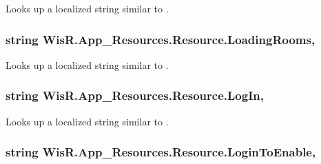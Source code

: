 Looks up a localized string similar to . 

\hypertarget{class_wis_r_1_1_app___resources_1_1_resource_a27c802797504c788ba97124cbaf281ef}{}
\subsubsection[{Loading\+Rooms}]{\setlength{\rightskip}{0pt plus 5cm}string Wis\+R.\+App\+\_\+\+Resources.\+Resource.\+Loading\+Rooms\hspace{0.3cm}{\ttfamily [static]}, {\ttfamily [get]}}\label{class_wis_r_1_1_app___resources_1_1_resource_a27c802797504c788ba97124cbaf281ef}


Looks up a localized string similar to . 

\hypertarget{class_wis_r_1_1_app___resources_1_1_resource_a57fdfbe77f61c98a62e24c6013857475}{}
\subsubsection[{Log\+In}]{\setlength{\rightskip}{0pt plus 5cm}string Wis\+R.\+App\+\_\+\+Resources.\+Resource.\+Log\+In\hspace{0.3cm}{\ttfamily [static]}, {\ttfamily [get]}}\label{class_wis_r_1_1_app___resources_1_1_resource_a57fdfbe77f61c98a62e24c6013857475}


Looks up a localized string similar to . 

\hypertarget{class_wis_r_1_1_app___resources_1_1_resource_a589a295314b805c77417752870036282}{}
\subsubsection[{Login\+To\+Enable}]{\setlength{\rightskip}{0pt plus 5cm}string Wis\+R.\+App\+\_\+\+Resources.\+Resource.\+Login\+To\+Enable\hspace{0.3cm}{\ttfamily [static]}, {\ttfamily [get]}}\label{class_wis_r_1_1_app___resources_1_1_resource_a589a295314b805c77417752870036282}


